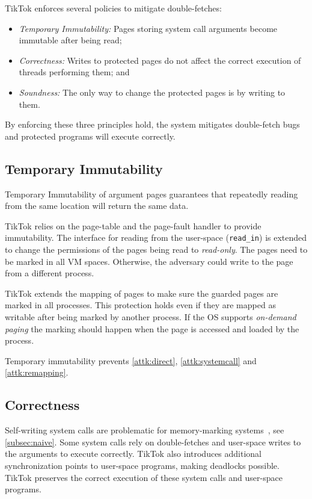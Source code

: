 \documentclass[conference]{IEEEtran}
\newcommand{\sysname}{TikTok}
\begin{document}
\sysname{} enforces several policies to mitigate double-fetches:

\begin{itemize}
  \item \label{policy:immutability} \emph{Temporary Immutability:} Pages storing
  system call arguments become immutable after being read;
  \item \label{policy:correctness} \emph{Correctness:} Writes to protected pages
  do not affect the correct execution of threads performing them; and
  \item \label{policy:soundness} \emph{Soundness:} The only way to change the
  protected pages is by writing to them.
\end{itemize}

By enforcing these three principles hold, the system mitigates double-fetch bugs and
protected programs will execute correctly.

\subsection{Temporary Immutability}
\label{subsec:tempimmut}
Temporary Immutability of argument pages guarantees that repeatedly reading from
the same location will return the same data.

\sysname{} relies on the
page-table and the page-fault handler to provide immutability. The interface for
reading from the user-space (\texttt{read\_in}) is extended to change the
permissions of the pages being read to \emph{read-only}. The pages need to be
marked in all VM spaces. Otherwise, the adversary could write to the
page from a different process.

\sysname{} extends the mapping of pages to make sure the guarded pages are marked in
all processes. This protection holds even if they are mapped as writable after
being marked by another process. If the OS supports \emph{on-demand paging} the
marking should happen when the page is accessed and loaded by the process.

Temporary immutability prevents \autoref{attk:direct}, \autoref{attk:systemcall}
and \autoref{attk:remapping}.

\subsection{Correctness}
\label{subsec:correctness}
Self-writing system calls are problematic for memory-marking
systems~\cite{watson2007exploiting}, see
\autoref{subsec:naive}. Some system calls rely on double-fetches and
user-space writes to the arguments to execute correctly. \sysname{} also
introduces additional synchronization points to user-space programs, making
deadlocks possible. \sysname{} preserves the correct execution of these
system calls and user-space programs.
\end{document}
